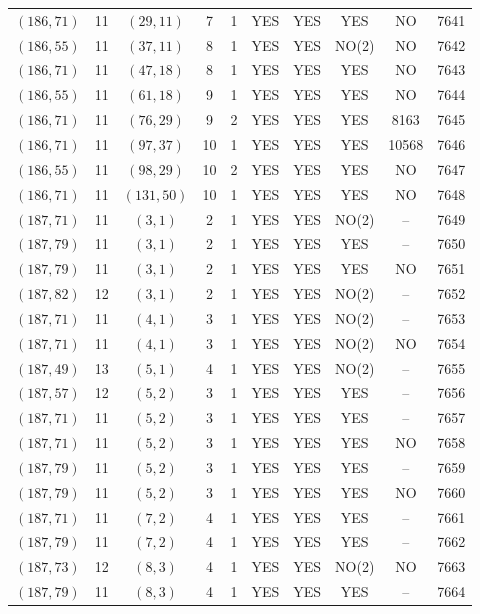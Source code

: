 \begin{longtable}{|c|c|c|c|c|c|c|c|c|c|}
$(186, 71)$ & 11 & $(29, 11)$ & 7 & 1 & YES & YES & YES & NO & 7641\\
$(186, 55)$ & 11 & $(37, 11)$ & 8 & 1 & YES & YES & NO(2) & NO & 7642\\
$(186, 71)$ & 11 & $(47, 18)$ & 8 & 1 & YES & YES & YES & NO & 7643\\
$(186, 55)$ & 11 & $(61, 18)$ & 9 & 1 & YES & YES & YES & NO & 7644\\
$(186, 71)$ & 11 & $(76, 29)$ & 9 & 2 & YES & YES & YES & 8163 & 7645\\
$(186, 71)$ & 11 & $(97, 37)$ & 10 & 1 & YES & YES & YES & 10568 & 7646\\
$(186, 55)$ & 11 & $(98, 29)$ & 10 & 2 & YES & YES & YES & NO & 7647\\
$(186, 71)$ & 11 & $(131, 50)$ & 10 & 1 & YES & YES & YES & NO & 7648\\
$(187, 71)$ & 11 & $(3, 1)$ & 2 & 1 & YES & YES & NO(2) & -- & 7649\\
$(187, 79)$ & 11 & $(3, 1)$ & 2 & 1 & YES & YES & YES & -- & 7650\\
$(187, 79)$ & 11 & $(3, 1)$ & 2 & 1 & YES & YES & YES & NO & 7651\\
$(187, 82)$ & 12 & $(3, 1)$ & 2 & 1 & YES & YES & NO(2) & -- & 7652\\
$(187, 71)$ & 11 & $(4, 1)$ & 3 & 1 & YES & YES & NO(2) & -- & 7653\\
$(187, 71)$ & 11 & $(4, 1)$ & 3 & 1 & YES & YES & NO(2) & NO & 7654\\
$(187, 49)$ & 13 & $(5, 1)$ & 4 & 1 & YES & YES & NO(2) & -- & 7655\\
$(187, 57)$ & 12 & $(5, 2)$ & 3 & 1 & YES & YES & YES & -- & 7656\\
$(187, 71)$ & 11 & $(5, 2)$ & 3 & 1 & YES & YES & YES & -- & 7657\\
$(187, 71)$ & 11 & $(5, 2)$ & 3 & 1 & YES & YES & YES & NO & 7658\\
$(187, 79)$ & 11 & $(5, 2)$ & 3 & 1 & YES & YES & YES & -- & 7659\\
$(187, 79)$ & 11 & $(5, 2)$ & 3 & 1 & YES & YES & YES & NO & 7660\\
$(187, 71)$ & 11 & $(7, 2)$ & 4 & 1 & YES & YES & YES & -- & 7661\\
$(187, 79)$ & 11 & $(7, 2)$ & 4 & 1 & YES & YES & YES & -- & 7662\\
$(187, 73)$ & 12 & $(8, 3)$ & 4 & 1 & YES & YES & NO(2) & NO & 7663\\
$(187, 79)$ & 11 & $(8, 3)$ & 4 & 1 & YES & YES & YES & -- & 7664\\

\end{longtable}
